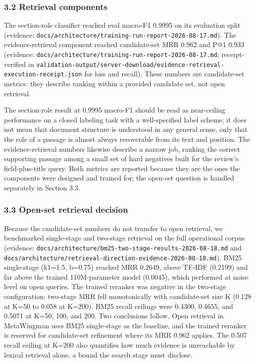 \documentclass[
]{article}
\begin{document}
\subsubsection{3.2 Retrieval components}\label{retrieval-components-1}

The section-role classifier reached eval macro-F1 0.9995 on its
evaluation split (evidence:
\texttt{docs/architecture/training-run-report-2026-08-17.md}). The
evidence-retrieval component reached candidate-set MRR 0.962 and P@1
0.933 (evidence:
\texttt{docs/architecture/training-run-report-2026-08-17.md};
receipt-verified in
\texttt{validation-output/server-download/evidence-retrieval-execution-receipt.json}
for loss and recall). These numbers are candidate-set metrics: they
describe ranking within a provided candidate set, not open retrieval.

The section-role result at 0.9995 macro-F1 should be read as
near-ceiling performance on a closed labeling task with a well-specified
label scheme; it does not mean that document structure is understood in
any general sense, only that the role of a passage is almost always
recoverable from its text and position. The evidence-retrieval numbers
likewise describe a narrow job, ranking the correct supporting passage
among a small set of hard negatives built for the review's
field-plus-title query. Both metrics are reported because they are the
ones the components were designed and trained for; the open-set question
is handled separately in Section 3.3.

\subsubsection{3.3 Open-set retrieval
decision}\label{open-set-retrieval-decision}

Because the candidate-set numbers do not transfer to open retrieval, we
benchmarked single-stage and two-stage retrieval on the full operational
corpus (evidence:
\texttt{docs/architecture/bm25-two-stage-results-2026-08-18.md} and
\texttt{docs/architecture/retrieval-direction-evidence-2026-08-18.md}).
BM25 single-stage (k1=1.5, b=0.75) reached MRR 0.2649, above TF-IDF
(0.2199) and far above the trained 110M-parameter model (0.0045), which
performed at noise level on open queries. The trained reranker was
negative in the two-stage configuration: two-stage MRR fell
monotonically with candidate-set size K (0.128 at K=50 to 0.058 at
K=200). BM25 recall ceilings were 0.4300, 0.4655, and 0.5071 at K=50,
100, and 200. Two conclusions follow. Open retrieval in MetaWingman uses
BM25 single-stage as the baseline, and the trained reranker is reserved
for candidate-set refinement where its MRR 0.962 applies. The 0.507
recall ceiling at K=200 also quantifies how much evidence is unreachable
by lexical retrieval alone, a bound the search stage must disclose.
\end{document}

